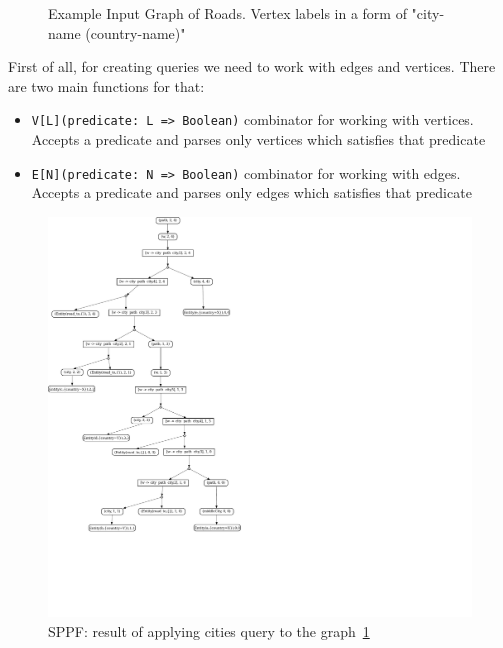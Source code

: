 
\begin{figure}[h]
\caption{Example Input Graph of Roads. Vertex labels in a form of "city-name (country-name)"}
\label{fig:graph}
\end{figure}

First of all, for creating queries we need to work with edges and vertices.
There are two main functions for that:
\begin{itemize}
    \item \lstinline{V[L](predicate: L => Boolean)} combinator for working with vertices. Accepts a predicate and parses only vertices which satisfies that predicate
    \item \lstinline{E[N](predicate: N => Boolean)} combinator for working with edges. Accepts a predicate and parses only edges which satisfies that predicate  
\end{itemize}

\begin{figure}[h]
\includegraphics[scale=0.45]{sppf}
\caption{SPPF: result of applying cities query to the graph~\ref{fig:graph}}
\label{fig:sppf}
\end{figure}




